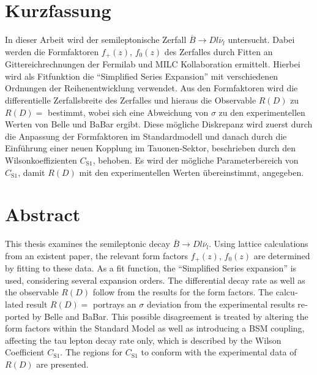 \thispagestyle{plain}

\section*{Kurzfassung}
In dieser Arbeit wird der semileptonische Zerfall $\overline{B} \to D l \overline{\nu}_l$ untersucht.
Dabei werden die Formfaktoren $f_+(z)$, $f_0(z)$ des Zerfalles durch Fitten an Gittereichrechnungen der Fermilab und MILC Kollaboration ermittelt.
Hierbei wird als Fitfunktion die \enquote{Simplified Series Expansion} mit verschiedenen Ordnungen der Reihenentwicklung verwendet.
Aus den Formfaktoren wird die differentielle Zerfallsbreite des Zerfalles und hieraus die Observable $R(D)$ zu $R(D) = $ bestimmt, wobei sich eine Abweichung von $\sigma$ zu den experimentellen Werten von Belle und BaBar ergibt.
Diese mögliche Diskrepanz wird zuerst durch die Anpassung der Formfaktoren im Standardmodell und danach durch die Einführung einer neuen Kopplung im Tauonen-Sektor, beschrieben durch den Wilsonkoeffizienten $C_{\text{S}1}$, behoben.
Es wird der mögliche Parameterbereich von $C_{\text{S}1}$, damit $R(D)$ mit den experimentellen Werten übereinstimmt, angegeben.


\section*{Abstract}
\begin{english}
This thesis examines the semileptonic decay $\overline{B} \to D l \overline{\nu}_l$.
Using lattice calculations from an existent paper, the relevant form factors $f_+(z)$, $f_0(z)$ are determined by fitting to these data.
As a fit function, the \enquote{Simplified Series expansion} is used, considering several expansion orders.
The differential decay rate as well as the observable $R(D)$ follow from the results for the form factors.
The calculated result $R(D) = $ portrays an $\sigma$ deviation from the experimental results reported by Belle and BaBar.
This possible disagreement is treated by altering the form factors within the Standard Model as well as introducing a BSM coupling, affecting the tau lepton decay rate only, which is described by the Wilson Coefficient $C_{\text{S}1}$.
The regions for $C_{\text{S}1}$ to conform with the experimental data of $R(D)$ are presented.
\end{english}
